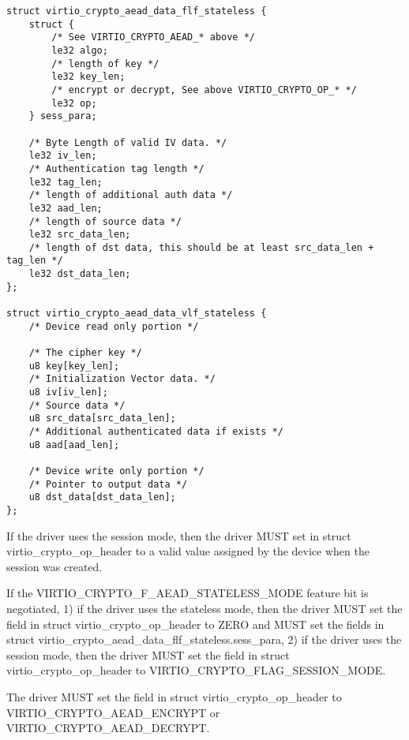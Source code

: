 \begin{lstlisting}
struct virtio_crypto_aead_data_flf_stateless {
    struct {
        /* See VIRTIO_CRYPTO_AEAD_* above */
        le32 algo;
        /* length of key */
        le32 key_len;
        /* encrypt or decrypt, See above VIRTIO_CRYPTO_OP_* */
        le32 op;
    } sess_para;

    /* Byte Length of valid IV data. */
    le32 iv_len;
    /* Authentication tag length */
    le32 tag_len;
    /* length of additional auth data */
    le32 aad_len;
    /* length of source data */
    le32 src_data_len;
    /* length of dst data, this should be at least src_data_len + tag_len */
    le32 dst_data_len;
};

struct virtio_crypto_aead_data_vlf_stateless {
    /* Device read only portion */

    /* The cipher key */
    u8 key[key_len];
    /* Initialization Vector data. */
    u8 iv[iv_len];
    /* Source data */
    u8 src_data[src_data_len];
    /* Additional authenticated data if exists */
    u8 aad[aad_len];

    /* Device write only portion */
    /* Pointer to output data */
    u8 dst_data[dst_data_len];
};
\end{lstlisting}


\begin{itemize*}
\item If the driver uses the session mode, then the driver MUST set
     in struct virtio_crypto_op_header to a valid value assigned
    by the device when the session was created.
\item If the VIRTIO_CRYPTO_F_AEAD_STATELESS_MODE feature bit is negotiated, 1) if
    the driver uses the stateless mode, then the driver MUST set the 
    field in struct virtio_crypto_op_header to ZERO and MUST set the fields in
    struct virtio_crypto_aead_data_flf_stateless.sess_para, 2) if the driver uses
    the session mode, then the driver MUST set the  field in struct
    virtio_crypto_op_header to VIRTIO_CRYPTO_FLAG_SESSION_MODE.
\item The driver MUST set the  field in struct virtio_crypto_op_header
    to VIRTIO_CRYPTO_AEAD_ENCRYPT or VIRTIO_CRYPTO_AEAD_DECRYPT.
\end{itemize*}

